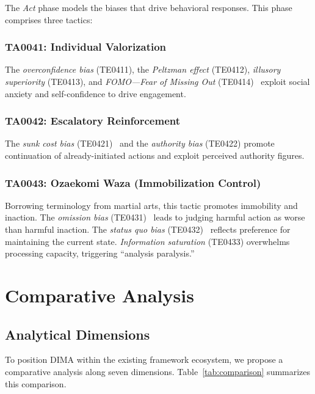 \documentclass[11pt,a4paper]{article}
\begin{document}
The \textit{Act} phase models the biases that drive behavioral responses. This phase comprises three tactics:

\subsubsection{TA0041: Individual Valorization}
The \textit{overconfidence bias} (TE0411), the \textit{Peltzman effect} (TE0412), \textit{illusory superiority} (TE0413), and \textit{FOMO---Fear of Missing Out} (TE0414)~\cite{przybylski2013} exploit social anxiety and self-confidence to drive engagement.

\subsubsection{TA0042: Escalatory Reinforcement}
The \textit{sunk cost bias} (TE0421)~\cite{arkes1985} and the \textit{authority bias} (TE0422) promote continuation of already-initiated actions and exploit perceived authority figures.

\subsubsection{TA0043: Ozaekomi Waza (Immobilization Control)}
Borrowing terminology from martial arts, this tactic promotes immobility and inaction. The \textit{omission bias} (TE0431)~\cite{spranca1991} leads to judging harmful action as worse than harmful inaction. The \textit{status quo bias} (TE0432)~\cite{samuelson1988} reflects preference for maintaining the current state. \textit{Information saturation} (TE0433) overwhelms processing capacity, triggering ``analysis paralysis.''

\section{Comparative Analysis}
\label{sec:comparative}

\subsection{Analytical Dimensions}

To position DIMA within the existing framework ecosystem, we propose a comparative analysis along seven dimensions. Table~\ref{tab:comparison} summarizes this comparison.
\end{document}
